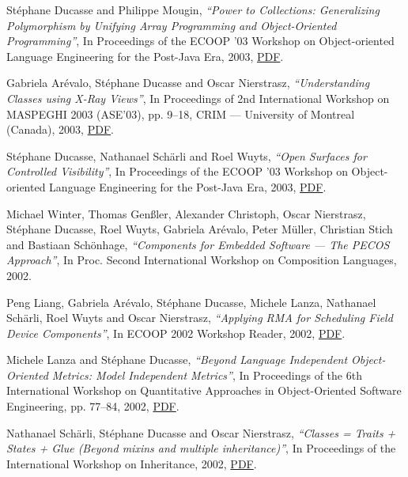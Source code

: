 \documentclass{article}
\newcommand{\czauthors}[1]{#1}
\newcommand{\cztitle}[1]{\emph{``#1''}}
\newcommand{\czbooktitle}[1]{#1}
\begin{document}
\begin{itemize}
	\pub  \czauthors{St\'ephane Ducasse and Philippe Mougin},  \cztitle{Power to Collections: Generalizing Polymorphism by Unifying Array Programming and Object-Oriented Programming},  In \czbooktitle{Proceedings of the ECOOP '03 Workshop on Object-oriented Language Engineering for the Post-Java Era}, 2003, \href{http://rmod-files.lille.inria.fr/Team/Texts/Papers/Duca03cOOPALEcoop.pdf}{PDF}.

	\pub  \czauthors{Gabriela Ar{\'e}valo, St\'ephane Ducasse and Oscar Nierstrasz},  \cztitle{Understanding Classes using {X-Ray} Views},  In \czbooktitle{Proceedings of 2nd International Workshop on MASPEGHI 2003 (ASE'03)}, pp. 9--18, CRIM --- University of Montreal (Canada), 2003, \href{http://rmod-files.lille.inria.fr/Team/Texts/Papers/Arev03d-MASPEGHI03-XRayViews.pdf}{PDF}.

	\pub  \czauthors{St\'ephane Ducasse, Nathanael Sch{\"a}rli and Roel Wuyts},  \cztitle{Open Surfaces for Controlled Visibility},  In \czbooktitle{Proceedings of the ECOOP '03 Workshop on Object-oriented Language Engineering for the Post-Java Era}, 2003, \href{http://rmod-files.lille.inria.fr/Team/Texts/Papers/Duca03bSurfaces.pdf}{PDF}.

	\pub  \czauthors{Michael Winter, Thomas Gen{\ss}ler, Alexander Christoph, Oscar Nierstrasz, St\'ephane Ducasse, Roel Wuyts, Gabriela Ar{\'e}valo, Peter M\"uller, Christian Stich and Bastiaan Sch\"onhage},  \cztitle{Components for Embedded Software --- The PECOS Approach},  In \czbooktitle{Proc. Second International Workshop on Composition Languages}, 2002.

	\pub  \czauthors{Peng Liang, Gabriela Ar{\'e}valo, St\'ephane Ducasse, Michele Lanza, Nathanael Sch{\"a}rli, Roel Wuyts and Oscar Nierstrasz},  \cztitle{Applying RMA for Scheduling Field Device Components},  In \czbooktitle{ECOOP 2002 Workshop Reader}, 2002, \href{http://rmod-files.lille.inria.fr/Team/Texts/Papers/Lian02aPecosRMA.pdf}{PDF}.

	\pub  \czauthors{Michele Lanza and St\'ephane Ducasse},  \cztitle{Beyond Language Independent Object-Oriented Metrics: Model Independent Metrics},  In \czbooktitle{Proceedings of the 6th International Workshop on Quantitative Approaches in Object-Oriented Software Engineering}, pp. 77--84, 2002, \href{http://rmod-files.lille.inria.fr/Team/Texts/Papers/Lanz02bModelIndependentMetrics.pdf}{PDF}.

	\pub  \czauthors{Nathanael Sch{\"a}rli, St\'ephane Ducasse and Oscar Nierstrasz},  \cztitle{Classes = Traits + States + Glue (Beyond mixins and multiple inheritance)},  In \czbooktitle{Proceedings of the International Workshop on Inheritance}, 2002, \href{http://rmod-files.lille.inria.fr/Team/Texts/Papers/Scha02aTraitsPlusGlue2002.pdf}{PDF}.


\end{itemize}
\end{document}
